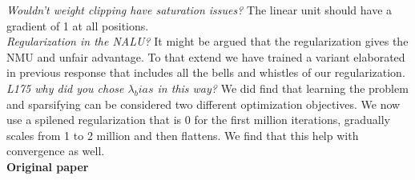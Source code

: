\documentclass{article}
\begin{document}
\textit{Wouldn't weight clipping have saturation issues?} The linear unit should have a gradient of 1 at all positions.\\
\textit{Regularization in the NALU?} It might be argued that the regularization gives the NMU and unfair advantage.
To that extend we have trained a variant elaborated in previous response that includes all the bells and whistles of our regularization.\\
\textit{L175 why did you chose $\lambda_bias$ in this way?} We did find that learning the problem and sparsifying can be considered two different optimization objectives.
We now use a spilened regularization that is 0 for the first million iterations, gradually scales from 1 to 2 million and then flattens.
We find that this help with convergence as well.\\

\textbf{Original paper}\\



\end{document}
